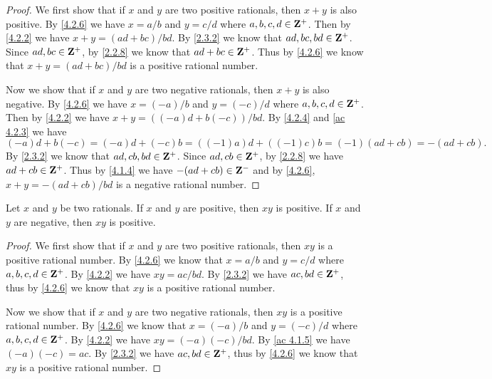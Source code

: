 \begin{proof}
  We first show that if \(x\) and \(y\) are two positive rationals, then \(x + y\) is also positive.
  By \cref{4.2.6} we have \(x = a / b\) and \(y = c / d\) where \(a, b, c, d \in \mathbf{Z}^+\).
  Then by \cref{4.2.2} we have \(x + y = (ad + bc) / bd\).
  By \cref{2.3.2} we know that \(ad, bc, bd \in \mathbf{Z}^+\).
  Since \(ad, bc \in \mathbf{Z}^+\), by \cref{2.2.8} we know that \(ad + bc \in \mathbf{Z}^+\).
  Thus by \cref{4.2.6} we know that \(x + y = (ad + bc) / bd\) is a positive rational number.

  Now we show that if \(x\) and \(y\) are two negative rationals, then \(x + y\) is also negative.
  By \cref{4.2.6} we have \(x = (-a) / b\) and \(y = (-c) / d\) where \(a, b, c, d \in \mathbf{Z}^+\).
  Then by \cref{4.2.2} we have \(x + y = ((-a)d + b(-c)) / bd\).
  By \cref{4.2.4} and \cref{ac 4.2.3} we have
  \[
    (-a)d + b(-c) = (-a)d + (-c)b = ((-1)a)d + ((-1)c)b = (-1)(ad + cb) = -(ad + cb).
  \]
  By \cref{2.3.2} we know that \(ad, cb, bd \in \mathbf{Z}^+\).
  Since \(ad, cb \in \mathbf{Z}^+\), by \cref{2.2.8} we have \(ad + cb \in \mathbf{Z}^+\).
  Thus by \cref{4.1.4} we have \(-(ad + cb) \in \mathbf{Z}^-\) and by \cref{4.2.6}, \(x + y = -(ad + cb) / bd\) is a negative rational number.
\end{proof}

\begin{additional corollary}\label{ac 4.2.5}
Let \(x\) and \(y\) be two rationals.
If \(x\) and \(y\) are positive, then \(xy\) is positive.
If \(x\) and \(y\) are negative, then \(xy\) is positive.
\end{additional corollary}

\begin{proof}
  We first show that if \(x\) and \(y\) are two positive rationals, then \(xy\) is a positive rational number.
  By \cref{4.2.6} we know that \(x = a / b\) and \(y = c / d\) where \(a, b, c, d \in \mathbf{Z}^+\).
  By \cref{4.2.2} we have \(xy = ac / bd\).
  By \cref{2.3.2} we have \(ac, bd \in \mathbf{Z}^+\), thus by \cref{4.2.6} we know that \(xy\) is a positive rational number.

  Now we show that if \(x\) and \(y\) are two negative rationals, then \(xy\) is a positive rational number.
  By \cref{4.2.6} we know that \(x = (-a) / b\) and \(y = (-c) / d\) where \(a, b, c, d \in \mathbf{Z}^+\).
  By \cref{4.2.2} we have \(xy = (-a)(-c) / bd\).
  By \cref{ac 4.1.5} we have \((-a)(-c) = ac\).
  By \cref{2.3.2} we have \(ac, bd \in \mathbf{Z}^+\), thus by \cref{4.2.6} we know that \(xy\) is a positive rational number.
\end{proof}


